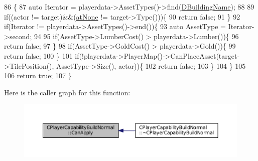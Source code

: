 \begin{DoxyCode}
86                                                                                                            
                                                        \{
87     \textcolor{keyword}{auto} Iterator = playerdata->AssetTypes()->find(\hyperlink{classCPlayerCapabilityBuildNormal_aae09d6cee5f8e201a0139c9065a5577c}{DBuildingName});
88     
89     \textcolor{keywordflow}{if}((actor != target)&&(\hyperlink{GameDataTypes_8h_a5600d4fc433b83300308921974477feca82fb51718e2c00981a2d37bc6fe92593}{atNone} != target->Type()))\{
90         \textcolor{keywordflow}{return} \textcolor{keyword}{false};
91     \}
92     \textcolor{keywordflow}{if}(Iterator != playerdata->AssetTypes()->end())\{
93         \textcolor{keyword}{auto} AssetType = Iterator->second;
94 
95         \textcolor{keywordflow}{if}(AssetType->LumberCost() > playerdata->Lumber())\{
96             \textcolor{keywordflow}{return} \textcolor{keyword}{false};   
97         \}
98         \textcolor{keywordflow}{if}(AssetType->GoldCost() > playerdata->Gold())\{
99             \textcolor{keywordflow}{return} \textcolor{keyword}{false};   
100         \}
101         \textcolor{keywordflow}{if}(!playerdata->PlayerMap()->CanPlaceAsset(target->TilePosition(), AssetType->Size(), actor))\{
102             \textcolor{keywordflow}{return} \textcolor{keyword}{false};
103         \}
104     \}
105 
106     \textcolor{keywordflow}{return} \textcolor{keyword}{true};
107 \}
\end{DoxyCode}
Here is the caller graph for this function\+:
\nopagebreak
\begin{figure}[H]
\begin{center}
\leavevmode
\includegraphics[width=350pt]{classCPlayerCapabilityBuildNormal_a1a8c6fdd9d8a91ecb7417163279e2276_icgraph}
\end{center}
\end{figure}
\hypertarget{classCPlayerCapabilityBuildNormal_a5487e5521779846198604e8ebadaf283}{}\label{classCPlayerCapabilityBuildNormal_a5487e5521779846198604e8ebadaf283} 
